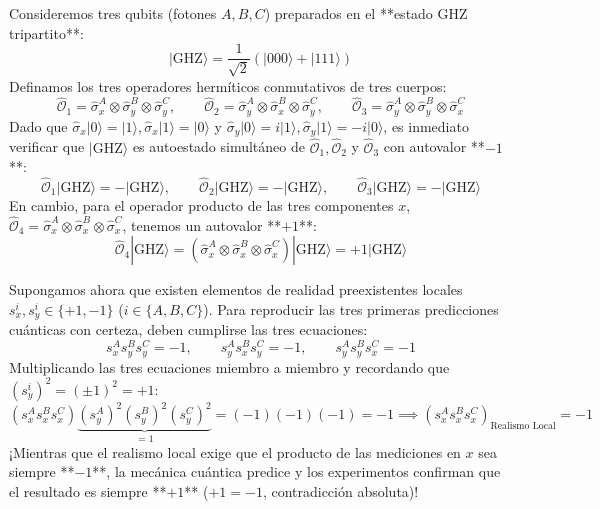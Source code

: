 \documentclass[11pt,a4paper]{book}
\begin{document}
Consideremos tres qubits (fotones $A, B, C$) preparados en el **estado GHZ tripartito**:
\begin{equation}
|\text{GHZ}\rangle = \frac{1}{\sqrt{2}} \left( |000\rangle + |111\rangle \right)
\end{equation}
Definamos los tres operadores hermíticos conmutativos de tres cuerpos:
\begin{equation}
\hat{\mathcal{O}}_1 = \hat{\sigma}_x^A \otimes \hat{\sigma}_y^B \otimes \hat{\sigma}_y^C, \qquad \hat{\mathcal{O}}_2 = \hat{\sigma}_y^A \otimes \hat{\sigma}_x^B \otimes \hat{\sigma}_y^C, \qquad \hat{\mathcal{O}}_3 = \hat{\sigma}_y^A \otimes \hat{\sigma}_y^B \otimes \hat{\sigma}_x^C
\end{equation}
Dado que $\hat{\sigma}_x|0\rangle = |1\rangle, \hat{\sigma}_x|1\rangle = |0\rangle$ y $\hat{\sigma}_y|0\rangle = i|1\rangle, \hat{\sigma}_y|1\rangle = -i|0\rangle$, es inmediato verificar que $|\text{GHZ}\rangle$ es autoestado simultáneo de $\hat{\mathcal{O}}_1, \hat{\mathcal{O}}_2$ y $\hat{\mathcal{O}}_3$ con autovalor **$-1$**:
\begin{equation}
\hat{\mathcal{O}}_1 |\text{GHZ}\rangle = -|\text{GHZ}\rangle, \qquad \hat{\mathcal{O}}_2 |\text{GHZ}\rangle = -|\text{GHZ}\rangle, \qquad \hat{\mathcal{O}}_3 |\text{GHZ}\rangle = -|\text{GHZ}\rangle
\end{equation}
En cambio, para el operador producto de las tres componentes $x$, $\hat{\mathcal{O}}_4 = \hat{\sigma}_x^A \otimes \hat{\sigma}_x^B \otimes \hat{\sigma}_x^C$, tenemos un autovalor **$+1$**:
\begin{equation}
\hat{\mathcal{O}}_4 |\text{GHZ}\rangle = \left(\hat{\sigma}_x^A \otimes \hat{\sigma}_x^B \otimes \hat{\sigma}_x^C\right) |\text{GHZ}\rangle = +1 |\text{GHZ}\rangle
\end{equation}

Supongamos ahora que existen elementos de realidad preexistentes locales $s_x^i, s_y^i \in \{+1, -1\}$ ($i \in \{A, B, C\}$). Para reproducir las tres primeras predicciones cuánticas con certeza, deben cumplirse las tres ecuaciones:
\[
s_x^A s_y^B s_y^C = -1, \qquad s_y^A s_x^B s_y^C = -1, \qquad s_y^A s_y^B s_x^C = -1
\]
Multiplicando las tres ecuaciones miembro a miembro y recordando que $(s_y^i)^2 = (\pm 1)^2 = +1$:
\begin{equation}
\left( s_x^A s_x^B s_x^C \right) \underbrace{(s_y^A)^2 (s_y^B)^2 (s_y^C)^2}_{=1} = (-1)(-1)(-1) = -1 \implies \left( s_x^A s_x^B s_x^C \right)_{\text{Realismo Local}} = -1
\end{equation}
¡Mientras que el realismo local exige que el producto de las mediciones en $x$ sea siempre **$-1$**, la mecánica cuántica predice y los experimentos confirman que el resultado es siempre **$+1$** ($+1 = -1$, contradicción absoluta)!
\end{document}
